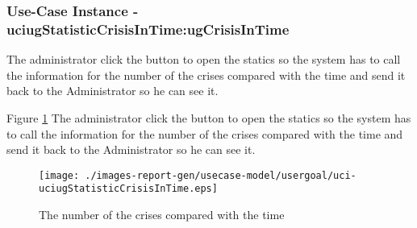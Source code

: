 
	\subsubsection{Use-Case Instance - uciugStatisticCrisisInTime:ugCrisisInTime}
	
	The administrator click the button to open the statics so the system has to call the information for the number of the crises compared with the time and send it back to the Administrator so he can see it. 		  
	\begin{operationmodel}
	
	\end{operationmodel} 

	
	Figure \ref{fig:lu.uni.lassy.excalibur.examples.icrash-RE-UC-uci-uciugStatisticCrisisInTime}
	The administrator click the button to open the statics so the system has to call the information for the number of the crises compared with the time and send it back to the Administrator so he can see it. 
	
	\begin{figure}[htbp]
	\begin{center}
	
	\texttt{[image: ./images-report-gen/usecase-model/usergoal/uci-uciugStatisticCrisisInTime.eps]}
	\end{center}
	\caption[lu.uni.lassy.excalibur.examples.icrash Sequence Diagram: uci-uciugStatisticCrisisInTime]{The number of the crises compared with the time}
	\label{fig:lu.uni.lassy.excalibur.examples.icrash-RE-UC-uci-uciugStatisticCrisisInTime}
	\end{figure}
	\vspace{0.5cm}
